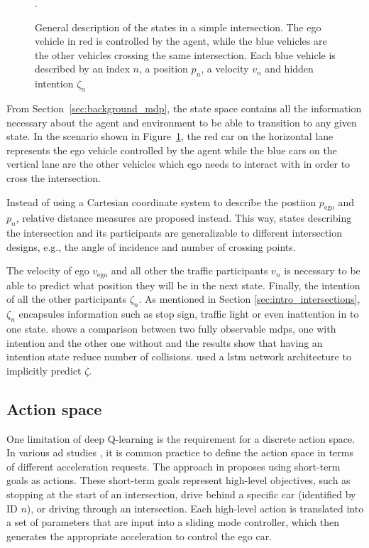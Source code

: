 \begin{figure}[h]
\begin{tikzpicture}
	\end{tikzpicture}
	\caption{General description of the states in a simple intersection. The ego vehicle in red is controlled by the agent, while the blue vehicles are the other vehicles crossing the same intersection. Each blue vehicle is described by an index $n$, a position $p_n$, a velocity $v_n$  and hidden intention $\zeta_n$}.
	\label{fig:intersection_scenario}
	\end{figure}

From Section~\ref{sec:background_mdp}, the state space contains all the information necessary about the agent and environment to be able to transition to any given state. In the scenario shown in Figure~\ref{fig:intersection_scenario}, the red car on the horizontal lane represents the ego vehicle controlled by the agent while the blue cars on the vertical lane are the other vehicles which ego needs to interact with in order to cross the intersection. 

Instead of using a Cartesian coordinate system to describe the postiion $p_\mathrm{ego}$ and $p_n$, relative distance measures are proposed instead. This way, states describing the intersection and its participants are generalizable to different intersection designs, e.g., the angle of incidence and number of crossing points. 

The velocity of ego $v_\mathrm{ego}$ and all other the traffic participants $v_n$ is necessary to be able to predict what position they will be in the next state. Finally, the intention of all the other participants $\zeta_n$. As mentioned in Section \ref{sec:intro_intersections}, $\zeta_n$ encapsules information such as stop sign, traffic light or even inattention in to one state. 
\paperBelief shows a comparison between two fully observable \gls{mdp}s, one with intention and the other one without and the results show that having an intention state reduce number of collisions. 
\paperLSTM used a \gls{lstm} network architecture to implicitly predict $\zeta$. %

\subsection{Action space}
One limitation of deep Q-learning is the requirement for a discrete action space. In various \gls{ad} studies \cite{bouton2019}, it is common practice to define the action space in terms of different acceleration requests. The approach in \paperLSTM proposes using short-term goals as actions. These short-term goals represent high-level objectives, such as stopping at the start of an intersection, drive behind a specific car (identified by ID $n$), or driving through an intersection. Each high-level action is translated into a set of parameters that are input into a sliding mode controller, which then generates the appropriate acceleration to control the ego car.

